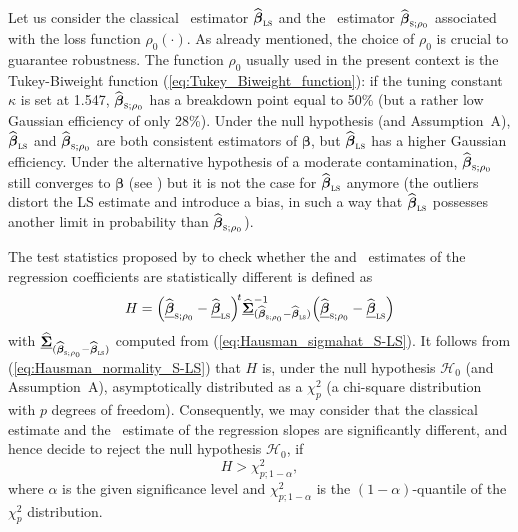 Let us consider the classical ~estimator
$\sthat{\boldsymbol\beta}_\stsc{LS}$ and the ~estimator
$\sthat{\boldsymbol\beta}_{\stsc{S};\rho_0}$ associated with the loss function
$\rho_0(\cdot)$. As already mentioned, the choice of $\rho_0$ is crucial to
guarantee robustness. The function $\rho_0$ usually used in the present context
is the Tukey-Biweight function (\ref{eq:Tukey_Biweight_function}): if the
tuning constant $\kappa$ is set at 1.547,
$\sthat{\boldsymbol\beta}_{\stsc{S};\rho_0}$ has a breakdown point equal to
50\% (but a rather low Gaussian efficiency of only 28\%). Under the null
hypothesis (and Assumption~A), $\sthat{\boldsymbol\beta}_\stsc{LS}$ and
$\sthat{\boldsymbol\beta}_{\stsc{S};\rho_0}$ are both consistent estimators of
$\boldsymbol\beta$, but $\sthat{\boldsymbol\beta}_\stsc{LS}$ has a higher
Gaussian efficiency. Under the alternative hypothesis of a moderate
contamination, $\sthat{\boldsymbol\beta}_{\stsc{S};\rho_0}$ still converges to
$\boldsymbol\beta$ (see \citealp{Omelka:2010}) but it is not the case for
$\sthat{\boldsymbol\beta}_\stsc{LS}$ anymore (the outliers distort the LS
estimate and introduce a bias, in such a way that
$\sthat{\boldsymbol\beta}_\stsc{LS}$ possesses another limit in probability
than $\sthat{\boldsymbol\beta}_{\stsc{S};\rho_0}$).

The test statistics proposed by \citet{Dehon:2012} to check whether the
 and ~estimates of the regression coefficients are
statistically different is defined as
\begin{equation}
    \label{Hausman_SvsLS}
    H = \left(\sthat{\underline{\boldsymbol\beta}}_{\stsc{S};\rho_0}
            - \sthat{\underline{\boldsymbol\beta}}_\stsc{LS}\right)^{\!t} 
        \sthat{\underline{\boldsymbol\Sigma}}_{(\sthat{\boldsymbol\beta}_{\stsc{S};\rho_0}
            - \sthat{\boldsymbol\beta}_\stsc{LS})}^{-1}
        \left(\sthat{\underline{\boldsymbol\beta}}_{\stsc{S};\rho_0}
            - \sthat{\underline{\boldsymbol\beta}}_\stsc{LS}\right)
%
\end{equation}
with 
$\sthat{\underline{\boldsymbol\Sigma}}_{(\sthat{\boldsymbol\beta}_{\stsc{S};\rho_0}
- \sthat{\boldsymbol\beta}_\stsc{LS})}$ computed from
(\ref{eq:Hausman_sigmahat_S-LS}). It follows from
(\ref{eq:Hausman_normality_S-LS}) that $H$ is, under the null hypothesis
$\mathcal{H}_0$ (and Assumption~A), asymptotically distributed as a
$\chi_p^2$ (a chi-square distribution with $p$ degrees of freedom).
Consequently, we may consider that the classical estimate and the 
~estimate of the regression slopes are significantly different, and hence decide
to reject the null hypothesis $\mathcal{H}_0$, if
\[
    H > \chi_{p;1-\alpha}^2,
\]
where $\alpha$ is the given significance level and $\chi_{p;1-\alpha}^2$ is the
$(1-\alpha)$-quantile of the $\chi_p^2$ distribution.


